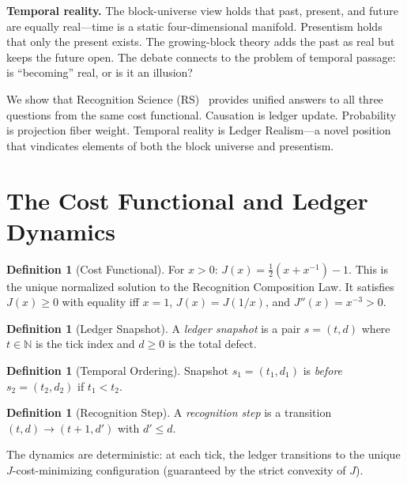\documentclass[12pt,a4paper]{article}
\theoremstyle{definition}
\newtheorem{definition}[theorem]{Definition}
\theoremstyle{remark}
\begin{document}
\textbf{Temporal reality.}  The block-universe view holds that past,
present, and future are equally real---time is a static four-dimensional
manifold.  Presentism holds that only the present exists.  The
growing-block theory adds the past as real but keeps the future open.
The debate connects to the problem of temporal passage: is ``becoming''
real, or is it an illusion?~\cite{Callender2011b}

We show that Recognition Science (RS)~\cite{RS_Axioms} provides
unified answers to all three questions from the same cost functional.
Causation is ledger update.  Probability is projection fiber weight.
Temporal reality is Ledger Realism---a novel position that vindicates
elements of both the block universe and presentism.

\section{The Cost Functional and Ledger Dynamics}
\label{sec:cost}

\begin{definition}[Cost Functional]
\label{def:J}
For $x > 0$:
$J(x) = \tfrac{1}{2}(x + x^{-1}) - 1$.
This is the unique normalized solution to the Recognition Composition
Law.  It satisfies $J(x) \geq 0$ with equality iff $x = 1$,
$J(x) = J(1/x)$, and $J''(x) = x^{-3} > 0$.
\end{definition}

\begin{definition}[Ledger Snapshot]
\label{def:snapshot}
A \emph{ledger snapshot} is a pair $s = (t, d)$ where $t \in \mathbb{N}$
is the tick index and $d \geq 0$ is the total defect.
\end{definition}

\begin{definition}[Temporal Ordering]
\label{def:before}
Snapshot $s_1 = (t_1, d_1)$ is \emph{before} $s_2 = (t_2, d_2)$ if
$t_1 < t_2$.
\end{definition}

\begin{definition}[Recognition Step]
\label{def:step}
A \emph{recognition step} is a transition
$(t, d) \to (t{+}1, d')$ with $d' \leq d$.
\end{definition}

The dynamics are deterministic: at each tick, the ledger transitions to
the unique $J$-cost-minimizing configuration (guaranteed by the strict
convexity of $J$).
\end{document}
